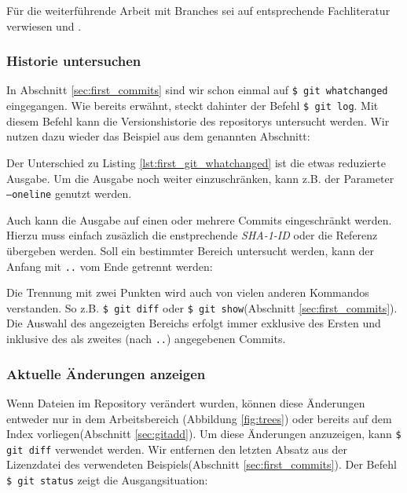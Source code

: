 Für die weiterführende Arbeit mit Branches sei auf entsprechende Fachliteratur
verwiesen \cite[388-389, 408-415]{cd} und \cite[56-88]{progit}.

\subsubsection{Historie untersuchen}\label{sec:arch}
In Abschnitt \ref{sec:first_commits} sind wir schon einmal auf \texttt{\$ git
whatchanged} eingegangen. Wie bereits erwähnt, steckt dahinter der Befehl
\texttt{\$ git log}. Mit diesem Befehl kann die Versionshistorie des
\glspl{repository} untersucht werden. Wir nutzen dazu wieder das Beispiel aus
dem genannten Abschnitt:



Der Unterschied zu Listing \ref{lst:first_git_whatchanged} ist die etwas
reduzierte Ausgabe. Um die Ausgabe noch weiter einzuschränken, kann z.B. der
Parameter \texttt{--oneline} genutzt werden.



Auch kann die Ausgabe auf einen oder mehrere Commits eingeschränkt werden.
Hierzu muss einfach zusäzlich die enstprechende \textit{SHA-1-ID} oder die
Referenz übergeben werden. Soll ein bestimmter Bereich untersucht werden, kann
der Anfang mit \texttt{..} vom Ende getrennt werden:



Die Trennung mit zwei Punkten wird auch von vielen anderen Kommandos
verstanden. So z.B. \texttt{\$ git diff} oder \texttt{\$ git show}(Abschnitt
\ref{sec:first_commits}). Die Auswahl des angezeigten Bereichs erfolgt immer
exklusive des Ersten und inklusive des als zweites (nach \texttt{..}) angegebenen
Commits.\cite[45-48]{gitosp}

\subsubsection{Aktuelle Änderungen anzeigen}\label{sec:gitdiff}
Wenn Dateien im Repository verändert wurden, können diese Änderungen entweder
nur in dem Arbeitsbereich (Abbildung \ref{fig:trees}) oder bereits auf dem
Index vorliegen(Abschnitt \ref{sec:gitadd}). Um diese Änderungen anzuzeigen,
kann \texttt{\$ git diff} verwendet werden. Wir entfernen den
letzten Absatz aus der Lizenzdatei des verwendeten Beispiels(Abschnitt
\ref{sec:first_commits}). Der Befehl \texttt{\$ git status} zeigt die
Ausgangsituation:

